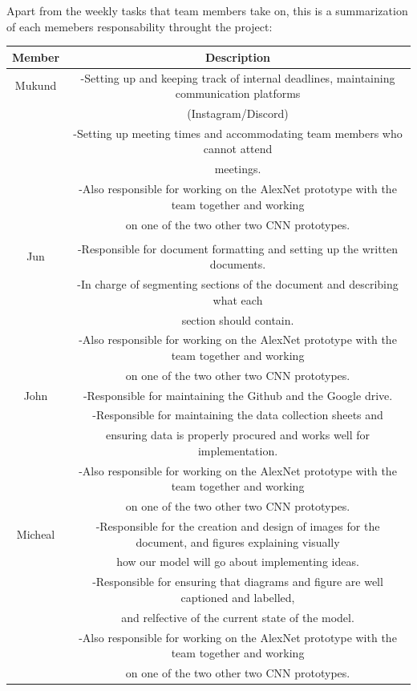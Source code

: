\documentclass{article} %
\begin{document}
Apart from the weekly tasks that team members take on, this is a summarization of each memebers responsability throught the project:
\begin{center}
\begin{tabular}{||c c||} 
 \hline
 Member & Description \\ [0.5ex] 
\hline\hline
Mukund           &-Setting up and keeping track of internal deadlines, maintaining communication platforms\\
		  & (Instagram/Discord)\\
		  &-Setting up meeting times and accommodating team members who cannot attend \\
		  & meetings. \\
		  &-Also responsible for working on the AlexNet prototype with the team together and working \\
		  & on one of the two other two CNN prototypes. \\  \\ [0.5ex] 
\hline
Jun                 &-Responsible for document formatting and setting up the written documents. \\
		 &-In charge of segmenting sections of the document and describing what each \\
		 & section should contain. \\
		 &-Also responsible for working on the AlexNet prototype with the team together and working \\
 		 & on one of the two other two CNN prototypes. \\
\hline
John             	 &-Responsible for maintaining the Github and the Google drive. \\
		 &-Responsible for maintaining the data collection sheets and  \\
		 & ensuring data is properly procured and works well for implementation.\\
		 &-Also responsible for working on the AlexNet prototype with the team together and working \\
 		 & on one of the two other two CNN prototypes. \\
\hline
Micheal          &-Responsible for the creation and design of images for the document, and figures explaining visually\\
		&how our model will go about implementing ideas.\\
		&-Responsible for ensuring that diagrams and figure are well captioned and labelled, \\
		&and relfective of the current state of the model. \\
		&-Also responsible for working on the AlexNet prototype with the team together and working \\
		& on one of the two other two CNN prototypes. \\
\hline

\end{tabular}
\end{center}
\end{document}
